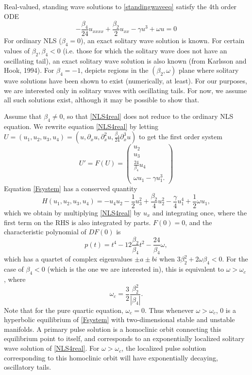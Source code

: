 \documentclass[12pt]{article}
\begin{document}
Real-valued, standing wave solutions to \cref{standingwaveeq} satisfy the 4th order ODE
\begin{equation}\label{NLS4real}
-\frac{\beta_4}{24} u_{xxxx} + \frac{\beta_2}{2} u_{xx} - \gamma u^3 + \omega u = 0
\end{equation}
For ordinary NLS ($\beta_4 = 0$), an exact solitary wave solution is known. For certain values of $\beta_2, \beta_4 < 0$ (i.e. those for which the solitary wave does not have an oscillating tail), an exact solitary wave solution is also known \cite[(5)]{Tam2020} (from Karlsson and Hook, 1994). For $\beta_4 = -1$, \cite[Figure 4(a)]{Tam2020} depicts regions in the $(\beta_2, \omega)$ plane where solitary wave solutions have been shown to exist (numerically, at least). For our purposes, we are interested only in solitary waves with oscillating tails. For now, we assume all such solutions exist, although it may be possible to show that.

Assume that $\beta_4 \neq 0$, so that \cref{NLS4real} does not reduce to the ordinary NLS equation. We rewrite equation \cref{NLS4real} by letting $U = (u_1, u_2, u_3, u_4) = (u, \partial_x u, \partial_x^2 u, \frac{\beta_4}{24} \partial_x^3 u)$ to get the first order system
\begin{equation}\label{Fsystem}
U' = F(U) = \begin{pmatrix}
u_2 \\ u_3 \\ \frac{24}{\beta_4} u_4 \\ \omega u_1 - \gamma u_1^3.
\end{pmatrix}
\end{equation}
Equation \cref{Fsystem} has a conserved quantity
\begin{equation}\label{FsystemH}
H(u_1, u_2, u_3, u_4) = -u_4 u_2 - \frac{1}{2} u_3^2 + \frac{\beta_2}{4}u_2^2 - \frac{\gamma}{4} u_1^4 + \frac{1}{2}\omega u_1,
\end{equation}
which we obtain by multiplying \cref{NLS4real} by $u_x$ and integrating once, where the first term on the RHS is also integrated by parts. $F(0) = 0$, and the characteristic polynomial of $DF(0)$ is
\[
p(t) = t^4 - 12\frac{\beta_2}{\beta_4} t^2 - \frac{24}{\beta_4}\omega,
\]
which has a quartet of complex eigenvalues $\pm a \pm b i$ when $3 \beta_2^2 + 2 \omega \beta_4 < 0$. For the case of $\beta_4 < 0$ (which is the one we are interested in), this is equivalent to $\omega > \omega_c$ \cite[(11)]{Tam2020}, where
\begin{equation}\label{omegac}
\omega_c = \frac{3}{2} \frac{\beta_2^2}{|\beta_4|}.
\end{equation}
Note that for the pure quartic equation, $\omega_c = 0$. Thus whenever $\omega > \omega_c$, 0 is a hyperbolic equilibrium of \cref{Fsystem} with two-dimensional stable and unstable manifolds. A primary pulse solution is a homoclinic orbit connecting this equilibrium point to itself, and corresponds to an exponentially localized solitary wave solution of \cref{NLS4real}. For $\omega > \omega_c$, the localized pulse solution corresponding to this homoclinic orbit will have exponentially decaying, oscillatory tails.
\end{document}
